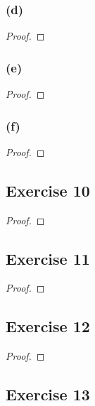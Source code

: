 \documentclass[14pt]{extarticle}
\begin{document}
\subsubsection{(d)}

\begin{proof}

\end{proof}

\subsubsection{(e)}

\begin{proof}

\end{proof}

\subsubsection{(f)}

\begin{proof}

\end{proof}

\subsection{Exercise 10}

\begin{proof}

\end{proof}

\subsection{Exercise 11}

\begin{proof}

\end{proof}

\subsection{Exercise 12}

\begin{proof}

\end{proof}

\subsection{Exercise 13}
\end{document}
